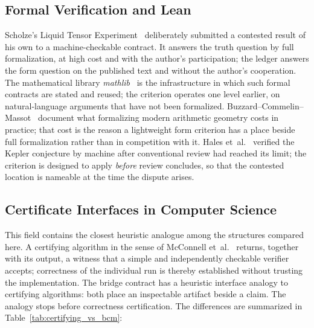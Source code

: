 \documentclass[11pt,a4paper]{article}
\begin{document}
\subsection{Formal Verification and Lean}\label{sec:related-formal}

Scholze's Liquid Tensor Experiment~\cite{Scholze2022LTE} deliberately submitted a
contested result of his own to a machine-checkable contract. It answers the
truth question by full
formalization, at high cost and with the author's participation; the ledger
answers the form question on the published text and without the author's
cooperation. The mathematical library
\emph{mathlib}~\cite{Mathlib2020} is the infrastructure in which such formal
contracts are stated and reused; the criterion operates one level earlier, on
natural-language arguments that have not been formalized.
Buzzard--Commelin--Massot~\cite{Buzzard2020} document what formalizing modern
arithmetic geometry costs in practice; that cost is the reason a lightweight
form criterion has a place beside full formalization rather than in competition
with it. Hales et~al.~\cite{Hales2017} verified the Kepler conjecture
by machine after conventional review had reached its limit; the criterion is
designed to apply \emph{before} review concludes, so that the contested location
is nameable at the time the dispute arises.

\subsection{Certificate Interfaces in Computer Science}\label{sec:related-certificates}

This field contains the closest heuristic analogue among the structures
compared here.
A certifying algorithm in the sense of McConnell et~al.~\cite{McConnell2011}
returns, together with its output, a witness that a simple and independently
checkable verifier accepts; correctness of the individual run is thereby
established without trusting the implementation. The bridge contract has a
heuristic interface analogy to certifying algorithms: both place an inspectable
artifact beside a claim. The analogy stops before correctness certification.
The differences are summarized in Table~\ref{tab:certifying_vs_bcm}:
\end{document}
